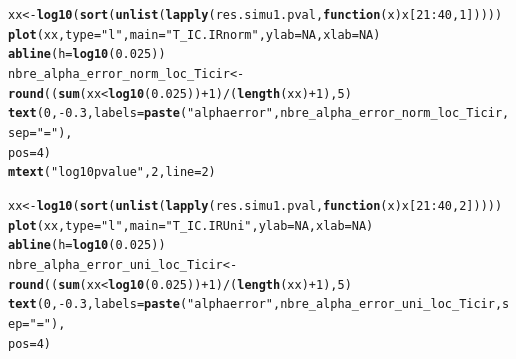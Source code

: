 \documentclass[12pt]{article}\usepackage[]{graphicx}\usepackage[]{color}
\makeatletter
\newcommand{\hlnum}[1]{\textcolor[rgb]{0.686,0.059,0.569}{#1}}%
\newcommand{\hlstr}[1]{\textcolor[rgb]{0.192,0.494,0.8}{#1}}%
\newcommand{\hlopt}[1]{\textcolor[rgb]{0,0,0}{#1}}%
\newcommand{\hlstd}[1]{\textcolor[rgb]{0.345,0.345,0.345}{#1}}%
\newcommand{\hlkwa}[1]{\textcolor[rgb]{0.161,0.373,0.58}{\textbf{#1}}}%
\newcommand{\hlkwb}[1]{\textcolor[rgb]{0.69,0.353,0.396}{#1}}%
\newcommand{\hlkwc}[1]{\textcolor[rgb]{0.333,0.667,0.333}{#1}}%
\newcommand{\hlkwd}[1]{\textcolor[rgb]{0.737,0.353,0.396}{\textbf{#1}}}%
\newenvironment{kframe}{%
 \def\at@end@of@kframe{}%
 \ifinner\ifhmode%
  \def\at@end@of@kframe{\end{minipage}}%
  \begin{minipage}{\columnwidth}%
 \fi\fi%
 \def\FrameCommand##1{\hskip\@totalleftmargin \hskip-\fboxsep
 \colorbox{shadecolor}{##1}\hskip-\fboxsep
     \hskip-\linewidth \hskip-\@totalleftmargin \hskip\columnwidth}%
 \MakeFramed {\advance\hsize-\width
   \@totalleftmargin\z@ \linewidth\hsize
   \@setminipage}}%
 {\par\unskip\endMakeFramed%
 \at@end@of@kframe}
\newenvironment{knitrout}{}{} %
\makeatother
\begin{document}
\begin{knitrout}
\begin{kframe}
\begin{alltt}
\hlstd{xx} \hlkwb{<-} \hlkwd{log10}\hlstd{(}\hlkwd{sort}\hlstd{(}\hlkwd{unlist}\hlstd{(}\hlkwd{lapply}\hlstd{(res.simu1.pval,} \hlkwa{function}\hlstd{(}\hlkwc{x}\hlstd{) x[}\hlnum{21}\hlopt{:}\hlnum{40}\hlstd{,} \hlnum{1}\hlstd{]))))}
\hlkwd{plot}\hlstd{(xx,} \hlkwc{type} \hlstd{=} \hlstr{"l"}\hlstd{,} \hlkwc{main} \hlstd{=} \hlstr{"T_IC.IR norm"}\hlstd{,} \hlkwc{ylab} \hlstd{=} \hlnum{NA}\hlstd{,} \hlkwc{xlab} \hlstd{=} \hlnum{NA}\hlstd{)}
\hlkwd{abline}\hlstd{(}\hlkwc{h} \hlstd{=} \hlkwd{log10}\hlstd{(}\hlnum{0.025}\hlstd{))}
\hlstd{nbre_alpha_error_norm_loc_Ticir} \hlkwb{<-} \hlkwd{round}\hlstd{((}\hlkwd{sum}\hlstd{(xx} \hlopt{<} \hlkwd{log10}\hlstd{(}\hlnum{0.025}\hlstd{))} \hlopt{+}\hlnum{1} \hlstd{)} \hlopt{/} \hlstd{(}\hlkwd{length}\hlstd{(xx)}\hlopt{+}\hlnum{1}\hlstd{),} \hlnum{5}\hlstd{)}
\hlkwd{text}\hlstd{(}\hlnum{0}\hlstd{,} \hlopt{-}\hlnum{0.3}\hlstd{,} \hlkwc{labels} \hlstd{=} \hlkwd{paste}\hlstd{(}\hlstr{"alpha error"}\hlstd{, nbre_alpha_error_norm_loc_Ticir,} \hlkwc{sep} \hlstd{=} \hlstr{" = "}\hlstd{),}
     \hlkwc{pos} \hlstd{=} \hlnum{4}\hlstd{)}
\hlkwd{mtext}\hlstd{(}\hlstr{"log10 pvalue"}\hlstd{,} \hlnum{2}\hlstd{,} \hlkwc{line} \hlstd{=} \hlnum{2}\hlstd{)}

\hlstd{xx} \hlkwb{<-} \hlkwd{log10}\hlstd{(}\hlkwd{sort}\hlstd{(}\hlkwd{unlist}\hlstd{(}\hlkwd{lapply}\hlstd{(res.simu1.pval,} \hlkwa{function}\hlstd{(}\hlkwc{x}\hlstd{) x[}\hlnum{21}\hlopt{:}\hlnum{40}\hlstd{,} \hlnum{2}\hlstd{]))))}
\hlkwd{plot}\hlstd{(xx,} \hlkwc{type} \hlstd{=} \hlstr{"l"}\hlstd{,} \hlkwc{main} \hlstd{=} \hlstr{"T_IC.IR Uni"}\hlstd{,} \hlkwc{ylab} \hlstd{=} \hlnum{NA}\hlstd{,} \hlkwc{xlab} \hlstd{=} \hlnum{NA}\hlstd{)}
\hlkwd{abline}\hlstd{(}\hlkwc{h} \hlstd{=} \hlkwd{log10}\hlstd{(}\hlnum{0.025}\hlstd{))}
\hlstd{nbre_alpha_error_uni_loc_Ticir} \hlkwb{<-} \hlkwd{round}\hlstd{((}\hlkwd{sum}\hlstd{(xx} \hlopt{<} \hlkwd{log10}\hlstd{(}\hlnum{0.025}\hlstd{))} \hlopt{+}\hlnum{1} \hlstd{)} \hlopt{/} \hlstd{(}\hlkwd{length}\hlstd{(xx)}\hlopt{+}\hlnum{1}\hlstd{),} \hlnum{5}\hlstd{)}
\hlkwd{text}\hlstd{(}\hlnum{0}\hlstd{,} \hlopt{-}\hlnum{0.3}\hlstd{,} \hlkwc{labels} \hlstd{=} \hlkwd{paste}\hlstd{(}\hlstr{"alpha error"}\hlstd{, nbre_alpha_error_uni_loc_Ticir,} \hlkwc{sep} \hlstd{=} \hlstr{" = "}\hlstd{),}
     \hlkwc{pos} \hlstd{=} \hlnum{4}\hlstd{)}


\end{alltt}
\end{kframe}
\end{knitrout}
\end{document}
